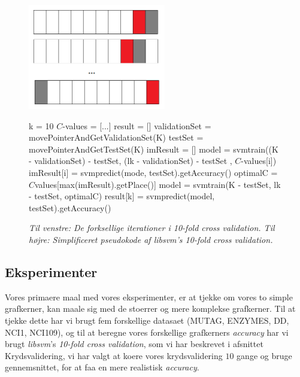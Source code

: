 \documentclass{article}
\begin{document}
\begin{figure}[H]
	\begin{minipage}{0.5\linewidth}
		\includegraphics[width=6cm]{10-fold-cross-validation_3}
	\end{minipage}
	\begin{minipage}{0.7\linewidth}
		\begin{algorithmic}[1]
				\State k = 10
				\State $C$-values = [...]
				\State result = []
					\State validationSet = movePointerAndGetValidationSet(K)
					\State testSet = movePointerAndGetTestSet(K)
					\State imResult = []
						\State model = svmtrain((K - validationSet) - testSet, (lk - validationSet) - testSet , $C$-values[i])
						\State imResult[i] = svmpredict(mode, testSet).getAccuracy()
					\EndFor
					\State optimalC = $C$values[max(imResult).getPlace()]
					\State model = svmtrain(K - testSet, lk - testSet, optimalC)
					\State result[k] = svmpredict(model, testSet).getAccuracy()
				\EndFor
				\State {}
			\EndFunction
		\end{algorithmic}
	\end{minipage}
\caption{\textit{Til venstre: De forksellige iterationer i 10-fold cross validation. Til højre: Simplificeret pseudokode af libsvm's 10-fold cross validation.}}
\label{fig:cross_validation}
\end{figure}


\subsection{Eksperimenter}
Vores primaere maal med vores eksperimenter, er at tjekke om vores to simple grafkerner, kan maale sig med de stoerrer og mere komplekse grafkerner. Til at tjekke dette har vi brugt fem forskellige datasaet (MUTAG, ENZYMES, DD, NCI1, NCI109), og til at beregne vores forskellige grafkerners \textit{accuracy} har vi brugt \textit{libsvm}'s \textit{10-fold cross validation}, som vi har beskrevet i afsnittet Krydsvalidering, vi har valgt at koere vores krydsvalidering $10$ gange og bruge gennemsnittet, for at faa en mere realistisk \textit{accuracy}.
\end{document}
